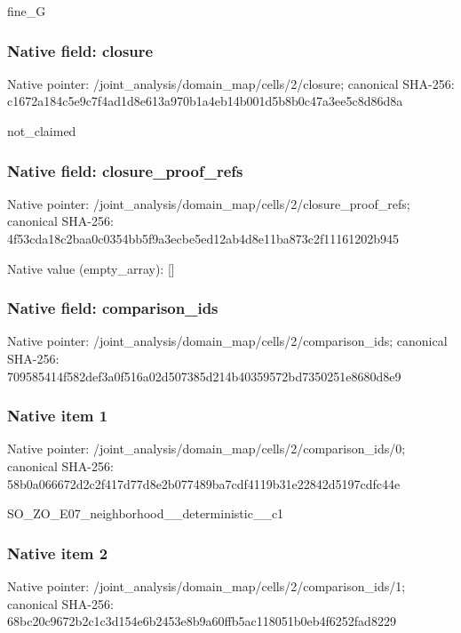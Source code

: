 \documentclass[10pt,a4paper]{article}
\begin{document}
\begingroup\raggedright\sloppy fine\_\allowbreak{}G\par\endgroup

\subsubsection{Native field: closure}
Native pointer: /joint\_\allowbreak{}analysis/domain\_\allowbreak{}map/cells/2/closure; canonical SHA-256: c1672a184c5e9c7f4ad1d8e613a970b1a4eb14b001d5b8b0c47a3ee5c8d86d8a

\begingroup\raggedright\sloppy not\_\allowbreak{}claimed\par\endgroup

\subsubsection{Native field: closure\_\allowbreak{}proof\_\allowbreak{}refs}
Native pointer: /joint\_\allowbreak{}analysis/domain\_\allowbreak{}map/cells/2/closure\_\allowbreak{}proof\_\allowbreak{}refs; canonical SHA-256: 4f53cda18c2baa0c0354bb5f9a3ecbe5ed12ab4d8e11ba873c2f11161202b945

Native value (empty\_\allowbreak{}array): []

\subsubsection{Native field: comparison\_\allowbreak{}ids}
Native pointer: /joint\_\allowbreak{}analysis/domain\_\allowbreak{}map/cells/2/comparison\_\allowbreak{}ids; canonical SHA-256: 709585414f582def3a0f516a02d507385d214b40359572bd7350251e8680d8e9

\subsubsection{Native item 1}
Native pointer: /joint\_\allowbreak{}analysis/domain\_\allowbreak{}map/cells/2/comparison\_\allowbreak{}ids/0; canonical SHA-256: 58b0a066672d2c2f417d77d8e2b077489ba7cdf4119b31e22842d5197cdfc44e

\begingroup\raggedright\sloppy SO\_\allowbreak{}ZO\_\allowbreak{}E07\_\allowbreak{}neighborhood\_\allowbreak{}\_\allowbreak{}deterministic\_\allowbreak{}\_\allowbreak{}c1\par\endgroup

\subsubsection{Native item 2}
Native pointer: /joint\_\allowbreak{}analysis/domain\_\allowbreak{}map/cells/2/comparison\_\allowbreak{}ids/1; canonical SHA-256: 68bc20c9672b2c1c3d154e6b2453e8b9a60ffb5ac118051b0eb4f6252fad8229
\end{document}
